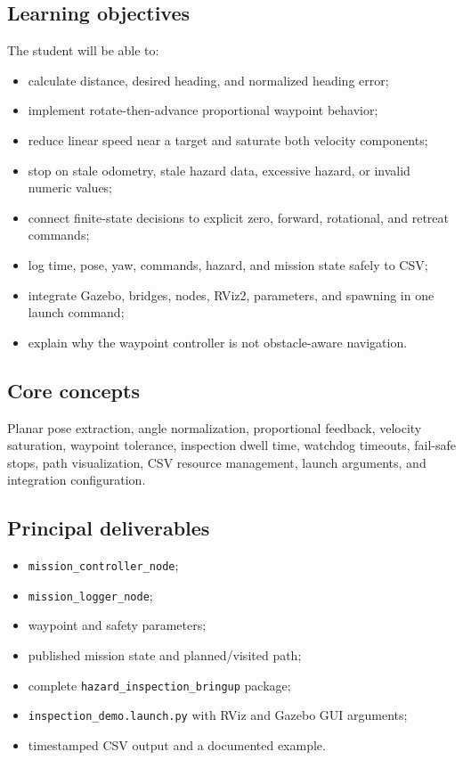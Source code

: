 \documentclass[11pt]{article}
\begin{document}
\subsection{Learning objectives}

The student will be able to:

\begin{itemize}
  \item calculate distance, desired heading, and normalized heading error;
  \item implement rotate-then-advance proportional waypoint behavior;
  \item reduce linear speed near a target and saturate both velocity components;
  \item stop on stale odometry, stale hazard data, excessive hazard, or invalid
        numeric values;
  \item connect finite-state decisions to explicit zero, forward, rotational,
        and retreat commands;
  \item log time, pose, yaw, commands, hazard, and mission state safely to CSV;
  \item integrate Gazebo, bridges, nodes, RViz2, parameters, and spawning in one
        launch command;
  \item explain why the waypoint controller is not obstacle-aware navigation.
\end{itemize}

\subsection{Core concepts}

Planar pose extraction, angle normalization, proportional feedback, velocity
saturation, waypoint tolerance, inspection dwell time, watchdog timeouts,
fail-safe stops, path visualization, CSV resource management, launch arguments,
and integration configuration.

\subsection{Principal deliverables}

\begin{itemize}
  \item \texttt{mission\_controller\_node};
  \item \texttt{mission\_logger\_node};
  \item waypoint and safety parameters;
  \item published mission state and planned/visited path;
  \item complete \texttt{hazard\_inspection\_bringup} package;
  \item \texttt{inspection\_demo.launch.py} with RViz and Gazebo GUI arguments;
  \item timestamped CSV output and a documented example.
\end{itemize}
\end{document}
